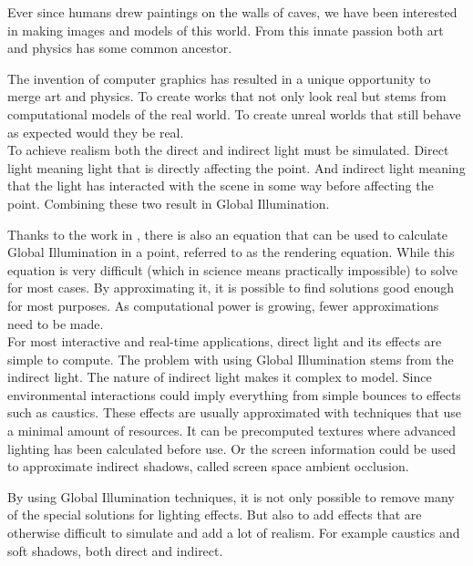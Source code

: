 

Ever since humans drew paintings on the walls of caves, we have been interested in making images and models of this world. From this innate passion both art and physics has some common ancestor. 

The invention of computer graphics has resulted in a unique opportunity to merge art and physics. To create works that not only look real but stems from computational models of the real world. To create unreal worlds that still behave as expected would they be real.\\

To achieve realism both the direct and indirect light must be simulated. Direct light meaning light that is directly affecting the point. And indirect light meaning that the light has interacted with the scene in some way before affecting the point. Combining these two result in Global Illumination.

Thanks to the work in \cite{renderingeq}, there is also an equation that can be used to calculate Global Illumination in a point, referred to as the rendering equation. While this equation is very difficult (which in science means practically impossible) to solve for most cases. By approximating it, it is possible to find solutions good enough for most purposes. As computational power is growing, fewer approximations need to be made. \\

For most interactive and real-time applications, direct light and its effects are simple to compute. The problem with using Global Illumination stems from the indirect light. The nature of indirect light makes it complex to model. Since environmental interactions could imply everything from simple bounces to effects such as caustics. These effects are usually approximated with techniques that use a minimal amount of resources. It can be precomputed textures where advanced lighting has been calculated before use. Or the screen information could be used to approximate indirect shadows, called screen space ambient occlusion.

By using Global Illumination techniques, it is not only possible to remove many of the special solutions for lighting effects. But also to add effects that are otherwise difficult to simulate and add a lot of realism. For example caustics and soft shadows, both direct and indirect.

